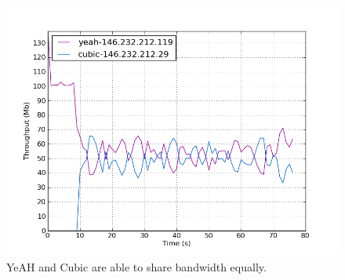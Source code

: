 \documentclass[11pt,a4paper,twocolumn]{article}
\begin{document}
\begin{figure}[p]
	\includegraphics[width=\linewidth]{exp69.png}
	\caption{YeAH and Cubic are able to share bandwidth equally.}
	\label{fig:cubic_yeah}
\end{figure}




\end{document}
